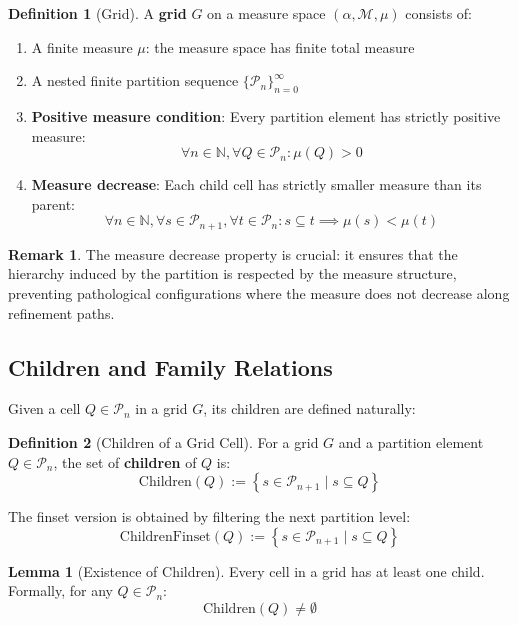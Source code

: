 \documentclass[12pt,a4paper]{article}
\theoremstyle{definition}
\newtheorem{definition}{Definition}[section]
\newtheorem{lemma}[theorem]{Lemma}
\newtheorem{remark}{Remark}[section]
\newcommand{\myset}[1]{\left\{#1\right\}}
\newcommand{\Nat}{\mathbb{N}}
\begin{document}
\begin{definition}[Grid]
A \textbf{grid} $G$ on a measure space $(\alpha, \mathcal{M}, \mu)$ consists of:

\begin{enumerate}[label=(\roman*)]
  \item A finite measure $\mu$: the measure space has finite total measure
  \item A nested finite partition sequence $\{\mathcal{P}_n\}_{n=0}^{\infty}$
  \item \textbf{Positive measure condition}: Every partition element has strictly positive measure:
    $$\forall n \in \Nat, \forall Q \in \mathcal{P}_n: \mu(Q) > 0$$
  \item \textbf{Measure decrease}: Each child cell has strictly smaller measure than its parent:
    $$\forall n \in \Nat, \forall s \in \mathcal{P}_{n+1}, \forall t \in \mathcal{P}_n: s \subseteq t \implies \mu(s) < \mu(t)$$
\end{enumerate}
\end{definition}

\begin{remark}
The measure decrease property is crucial: it ensures that the hierarchy induced by the partition is respected by the measure structure, preventing pathological configurations where the measure does not decrease along refinement paths.
\end{remark}

\subsection{Children and Family Relations}

Given a cell $Q \in \mathcal{P}_n$ in a grid $G$, its children are defined naturally:

\begin{definition}[Children of a Grid Cell]
For a grid $G$ and a partition element $Q \in \mathcal{P}_n$, the set of \textbf{children} of $Q$ is:
$$\text{Children}(Q) := \myset{s \in \mathcal{P}_{n+1} \mid s \subseteq Q}$$

The finset version is obtained by filtering the next partition level:
$$\text{ChildrenFinset}(Q) := \myset{s \in \mathcal{P}_{n+1} \mid s \subseteq Q}$$
\end{definition}

\begin{lemma}[Existence of Children]
Every cell in a grid has at least one child. Formally, for any $Q \in \mathcal{P}_n$:
$$\text{Children}(Q) \neq \emptyset$$
\end{lemma}
\end{document}

